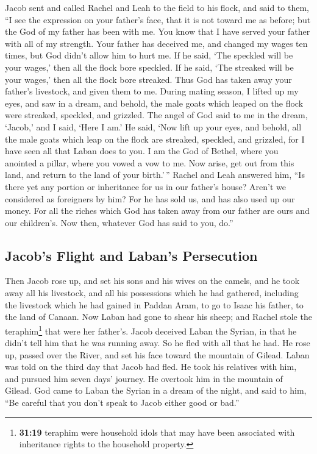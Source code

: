  Jacob sent and called Rachel and Leah to the field to his
flock,  and said to them, ``I see the expression on your
father's face, that it is not toward me as before; but the God of my
father has been with me.  You know that I have served your
father with all of my strength.  Your father has deceived
me, and changed my wages ten times, but God didn't allow him to hurt me.
 If he said, `The speckled will be your wages,' then all
the flock bore speckled. If he said, `The streaked will be your wages,'
then all the flock bore streaked.  Thus God has taken away
your father's livestock, and given them to me.  During
mating season, I lifted up my eyes, and saw in a dream, and behold, the
male goats which leaped on the flock were streaked, speckled, and
grizzled.  The angel of God said to me in the dream,
`Jacob,' and I said, `Here I am.'  He said, `Now lift up
your eyes, and behold, all the male goats which leap on the flock are
streaked, speckled, and grizzled, for I have seen all that Laban does to
you.  I am the God of Bethel, where you anointed a
pillar, where you vowed a vow to me. Now arise, get out from this land,
and return to the land of your birth.'\,''  Rachel and
Leah answered him, ``Is there yet any portion or inheritance for us in
our father's house?  Aren't we considered as foreigners
by him? For he has sold us, and has also used up our money.
 For all the riches which God has taken away from our
father are ours and our children's. Now then, whatever God has said to
you, do.''

\hypertarget{jacobs-flight-and-labans-persecution}{%
\subsection{Jacob's Flight and Laban's
Persecution}\label{jacobs-flight-and-labans-persecution}}

 Then Jacob rose up, and set his sons and his wives on
the camels,  and he took away all his livestock, and all
his possessions which he had gathered, including the livestock which he
had gained in Paddan Aram, to go to Isaac his father, to the land of
Canaan.  Now Laban had gone to shear his sheep; and
Rachel stole the teraphim\footnote{\textbf{31:19} teraphim were
  household idols that may have been associated with inheritance rights
  to the household property.} that were her father's. 
Jacob deceived Laban the Syrian, in that he didn't tell him that he was
running away.  So he fled with all that he had. He rose
up, passed over the River, and set his face toward the mountain of
Gilead.  Laban was told on the third day that Jacob had
fled.  He took his relatives with him, and pursued him
seven days' journey. He overtook him in the mountain of Gilead.
 God came to Laban the Syrian in a dream of the night,
and said to him, ``Be careful that you don't speak to Jacob either good
or bad.''


